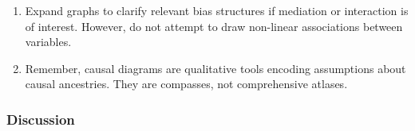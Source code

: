 \documentclass[
  singlecolumn]{article}
\begin{document}
\begin{enumerate}
\def\labelenumi{\arabic{enumi}.}
\setcounter{enumi}{10}
\item
  Expand graphs to clarify relevant bias structures if mediation or
  interaction is of interest. However, do not attempt to draw non-linear
  associations between variables.
\item
  Remember, causal diagrams are qualitative tools encoding assumptions
  about causal ancestries. They are compasses, not comprehensive
  atlases.
\end{enumerate}

\hypertarget{discussion}{%
\subsubsection{Discussion}\label{discussion}}
\end{document}
